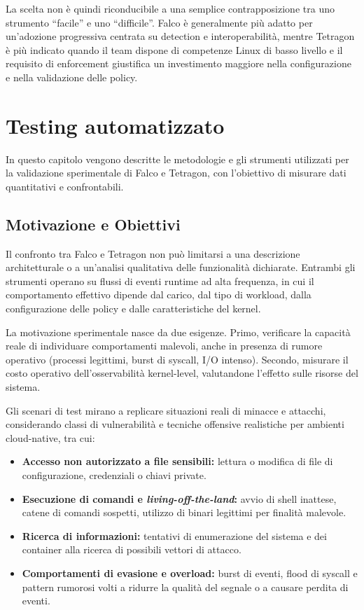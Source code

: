 \documentclass[12pt,a4paper,openright,twoside]{book}
\begin{document}
La scelta non è quindi riconducibile a una semplice contrapposizione tra uno strumento ``facile'' e uno ``difficile''. Falco è generalmente più adatto per un'adozione progressiva centrata su detection e interoperabilità, mentre Tetragon è più indicato quando il team dispone di competenze Linux di basso livello e il requisito di enforcement giustifica un investimento maggiore nella configurazione e nella validazione delle policy.


\chapter{Testing automatizzato}
\label{chap:testing}
In questo capitolo vengono descritte le metodologie e gli strumenti utilizzati per la validazione sperimentale di Falco e Tetragon, con l'obiettivo di misurare dati quantitativi e confrontabili.

\section{Motivazione e Obiettivi}

Il confronto tra Falco e Tetragon non può limitarsi a una descrizione architetturale o a un'analisi qualitativa delle funzionalità dichiarate. Entrambi gli strumenti operano su flussi di eventi runtime ad alta frequenza, in cui il comportamento effettivo dipende dal carico, dal tipo di workload, dalla configurazione delle policy e dalle caratteristiche del kernel.

La motivazione sperimentale nasce da due esigenze. Primo, verificare la capacità reale di individuare comportamenti malevoli, anche in presenza di rumore operativo (processi legittimi, burst di syscall, I/O intenso). Secondo, misurare il costo operativo dell'osservabilità kernel-level, valutandone l'effetto sulle risorse del sistema.

Gli scenari di test mirano a replicare situazioni reali di minacce e attacchi, considerando classi di vulnerabilità e tecniche offensive realistiche per ambienti cloud-native, tra cui:
\begin{itemize}
    \item \textbf{Accesso non autorizzato a file sensibili:} lettura o modifica di file di configurazione, credenziali o chiavi private.
    \item \textbf{Esecuzione di comandi e \textit{living-off-the-land}:} avvio di shell inattese, catene di comandi sospetti, utilizzo di binari legittimi per finalità malevole.
    \item \textbf{Ricerca di informazioni:} tentativi di enumerazione del sistema e dei container alla ricerca di possibili vettori di attacco.
    \item \textbf{Comportamenti di evasione e overload:} burst di eventi, flood di syscall e pattern rumorosi volti a ridurre la qualità del segnale o a causare perdita di eventi.
\end{itemize}
\end{document}
